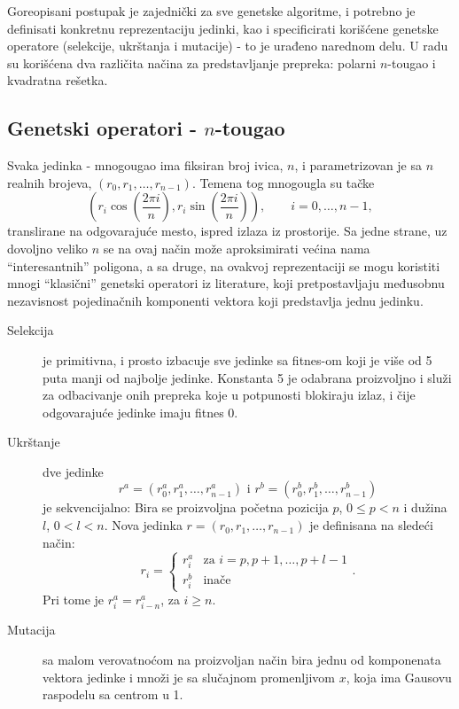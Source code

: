 \documentclass[12pt]{article}
\begin{document}
Goreopisani postupak je zajednički za sve genetske algoritme, i potrebno je definisati konkretnu reprezentaciju jedinki, kao i specificirati korišćene genetske operatore (selekcije, ukrštanja i mutacije) - to je urađeno narednom delu. U radu su korišćena dva različita načina za predstavljanje prepreka: polarni $n$-tougao i kvadratna rešetka.

\subsection{Genetski operatori - $n$-tougao}

Svaka jedinka - mnogougao ima fiksiran broj ivica, $n$, i parametrizovan je sa $n$ realnih brojeva, $(r_0, r_1, \dots, r_{n-1})$. Temena tog mnogougla su tačke
$$\left(r_i \cos\left(\frac{2\pi i}{n}\right), r_i \sin\left(\frac{2\pi i}{n}\right)\right), \qquad i=0,\dots,n-1,$$
translirane na odgovarajuće mesto, ispred izlaza iz prostorije. Sa jedne strane, uz dovoljno veliko $n$ se na ovaj način može aproksimirati većina nama ``interesantnih'' poligona, a sa druge, na ovakvoj reprezentaciji se mogu koristiti mnogi ``klasični'' genetski operatori iz literature, koji pretpostavljaju međusobnu nezavisnost pojedinačnih komponenti vektora koji predstavlja jednu jedinku.

\begin{description}
\item[Selekcija] je primitivna, i prosto izbacuje sve jedinke sa fitnes-om koji je više od 5 puta manji od najbolje jedinke. Konstanta 5 je odabrana proizvoljno i služi za odbacivanje onih prepreka koje u potpunosti blokiraju izlaz, i čije odgovarajuće jedinke imaju fitnes 0.
\item[Ukrštanje] dve jedinke 
$$r^a = (r^a_0, r^a_1, \dots, r^a_{n-1}) \text{ i } r^b=(r^b_0, r^b_1, \dots, r^b_{n-1})$$ je sekvencijalno: Bira se proizvoljna početna pozicija $p$, $0\leq p < n$ i dužina $l$, $0 < l < n $. Nova jedinka $r = (r_0, r_1, \dots, r_{n-1})$ je definisana na sledeći način:
$$
r_i = 
\begin{cases}
    r^a_i & \text{za } i=p, p+1, \dots, p+l-1\\
    r^b_i & \text{inače}
\end{cases}.
$$
Pri tome je $r^a_i = r^a_{i-n}$, za $i\geq n$.
\item[Mutacija] sa malom verovatnoćom na proizvoljan način bira jednu od komponenata vektora jedinke i množi je sa slučajnom promenljivom $x$, koja ima Gausovu raspodelu sa centrom u 1.
\end{description}
\end{document}
